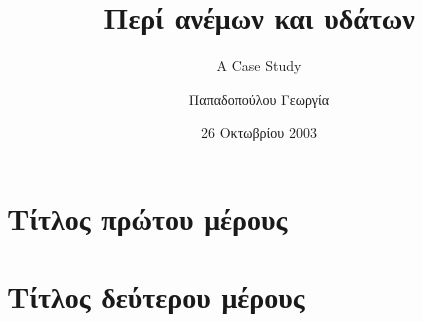 \documentclass[twoside,a4paper,leqno]{book}
\author{Παπαδοπούλου Γεωργία}
\title{Περί ανέμων και υδάτων}
\subtitle{A Case Study}
\date{26 Οκτωβρίου 2003}
\begin{document}



\tableofcontents



\cleardoublepage


\part{Τίτλος πρώτου μέρους}





\part{Τίτλος δεύτερου μέρους}





\appendix




\backmatter

\printindex

\clearpage



\end{document}
